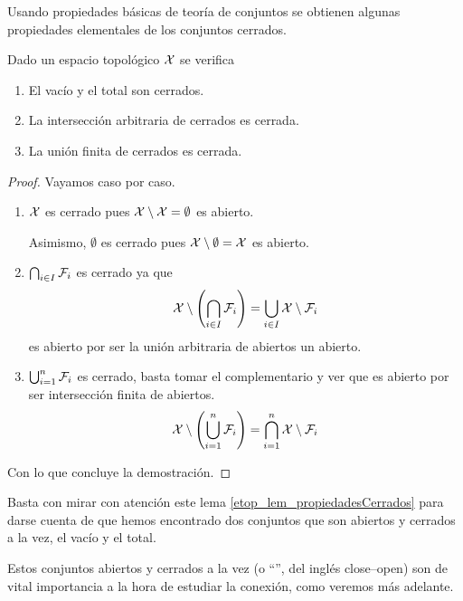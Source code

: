 Usando propiedades básicas de teoría de conjuntos se obtienen algunas propiedades elementales de los conjuntos cerrados.
\begin{lem}
	\label{etop_lem_propiedadesCerrados}
	Dado un espacio topológico $\mathcal{X}$ se verifica
	\begin{enumerate}
		\item El vacío y el total son cerrados.
		\item La intersección arbitraria de cerrados es cerrada.
		\item La unión finita de cerrados es cerrada.
	\end{enumerate}
\end{lem}
\begin{proof}Vayamos caso por caso.
	\begin{enumerate}
		\item $\mathcal{X}$ es cerrado pues $\mathcal{X}\setminus\mathcal{X}=\emptyset$ es abierto.
		
		Asimismo, $\emptyset$ es cerrado pues $\mathcal{X}\setminus\emptyset=\mathcal{X}$ es abierto.
		\item $\bigcap_{i\in I}\mathcal{F}_i$ es cerrado ya que
		\begin{equation*}
		\mathcal{X}\setminus\left(\bigcap_{i\in I}\mathcal{F}_i\right)=\bigcup_{i\in I}\mathcal{X}\setminus\mathcal{F}_i
		\end{equation*}
		es abierto por ser la unión arbitraria de abiertos un abierto.
		\item $\bigcup_{i=1}^n\mathcal{F}_i$ es cerrado, basta tomar el complementario y ver que es abierto por ser intersección finita de abiertos.
		\begin{equation*}
		\mathcal{X}\setminus\left(\bigcup_{i=1}^{n}\mathcal{F}_i\right)=\bigcap_{i=1}^n\mathcal{X}\setminus\mathcal{F}_i
		\end{equation*}
	\end{enumerate}
	Con lo que concluye la demostración.
\end{proof}
\begin{obs}
	\label{etop_obs_abiertoCerrado}
	Basta con mirar con atención este lema \ref{etop_lem_propiedadesCerrados} para darse cuenta de que hemos encontrado dos conjuntos que son abiertos y cerrados a la vez, el vacío y el total.
	
	Estos conjuntos abiertos y cerrados a la vez (o ``'', del inglés close--open) son de vital importancia a la hora de estudiar la conexión, como veremos más adelante. 
\end{obs}
